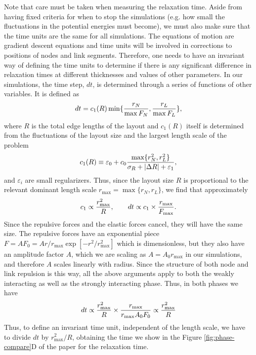 \documentclass[linenumbers,endfloats,nofootinbib,preprint,floatfix,titlepage,superscriptaddress]{revtex4-1} %
\begin{document}
Note that care must be taken when measuring the relaxation time. 
Aside from having fixed criteria for when to stop the simulations (e.g. how small the fluctuations in the potential energies must become), we must also make sure that the time units are the same for all simulations. 
The equations of motion are gradient descent equations and time units will be involved in corrections to positions of nodes and link segments. 
Therefore, one needs to have an invariant way of defining the time units to determine if there is any significant difference in relaxation times at different thicknesses and values of other parameters. 
In our simulations, the time step, $dt$, is determined through a series of functions of other variables. 
It is defined as 
$$dt = c_1( R) \min\{{r_N\over \max{F_N}},{r_L\over \max{F_L}}\}, $$
where $R$ is the total edge lengths of the layout and $c_1(R)$ itself is determined from the fluctuations of the layout size and the largest length scale of the problem
$$ c_1(R) \equiv \varepsilon_0 + c_0 {\max\{r_N^2, r_L^2\}\over \sigma_R + |\Delta R|+\varepsilon_1},$$
and $\varepsilon_i$ are small regularizers. 
Thus, since the layout size $R$ is proportional to the relevant dominant length scale $r_{\max} = \max{\{r_N, r_L\}} $, we find that approximately
\[ c_1 \propto {r_{\max}^2\over R}, \qquad dt \propto c_1 \times {r_{\max} \over F_{\max}}. \]
Since the repulsive forces and the elastic forces cancel, they will have the same size. The repulsive forces have an exponential piece $ F = A F_0 = A r/r_{\max} \exp[-r^2/r^2_{\max}] $ which is dimensionless, but they also have an amplitude factor $A$, which we are scaling as $A = A_0 r_{\max}$ in our simulations, and therefore $A$ scales linearly with radius. 
Since the structure of both node and link repulsion is this way, all the above arguments apply to both the weakly interacting as well as the strongly interacting phase. %
Thus, in both phases we have
$$ dt \propto {r_{\max}^2\over R} \times {r_{\max} \over r_{\max} A_0 F_0 } \propto {r_{\max}^2\over R} $$
Thus, to define an invariant time unit, independent of the length scale, we have to divide $dt$ by $r_{\max}^2/ R$, obtaining the time we show in the Figure \ref{fig:phase-compare}D of the paper for the relaxation time. 
\end{document}
